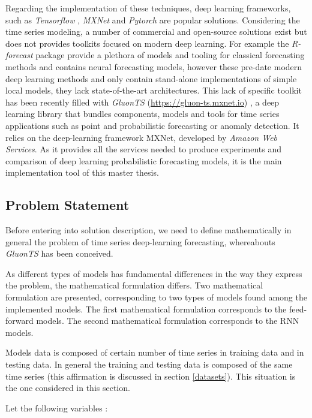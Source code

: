 Regarding the implementation of these techniques, deep learning frameworks, such as \textit{Tensorflow} \cite{tensorflow}, \textit{MXNet} \cite{mxnet} and \textit{Pytorch} \cite{pytorch} are popular solutions. Considering  the time series modeling, a  number of  commercial and open-source solutions exist but does not provides toolkits focused on modern deep learning.  For example the  \textit{R-forecast}  package  \cite{r_article}  provide a plethora of models and tooling for classical forecasting methods and contains neural forecasting models, however these pre-date modern deep learning methods and only contain stand-alone implementations of simple local models, they lack state-of-the-art architectures. 
This lack of specific toolkit has been recently filled with \textit{GluonTS} (\url{https://gluon-ts.mxnet.io}) \cite{gluontsbible}, a deep learning library that bundles components, models and tools for time series applications such as point and probabilistic forecasting or anomaly detection. It relies on the deep-learning framework MXNet, developed by \textit{Amazon Web Services}.
As it provides all the services needed to produce experiments and comparison of deep learning probabilistic forecasting models, it is the main implementation tool of this master thesis.


\subsection{Problem Statement} \label{problem_statement}

Before entering into solution description, we need to define mathematically in general the problem of time series deep-learning forecasting, whereabouts \textit{GluonTS} has been conceived. 

As different types of models has fundamental differences in the way they express the problem, the mathematical formulation differs.
Two mathematical formulation are presented, corresponding to two types of models found among the implemented models.
The first mathematical formulation corresponds to the feed-forward models.
The second mathematical formulation corresponds to the RNN models. 

Models data is composed of certain number of time series in training data and in testing data. 
In general the training and testing data is composed of the same time series (this affirmation is discussed in section \ref{datasets}). This situation is the one considered in this section.

Let the following variables :

